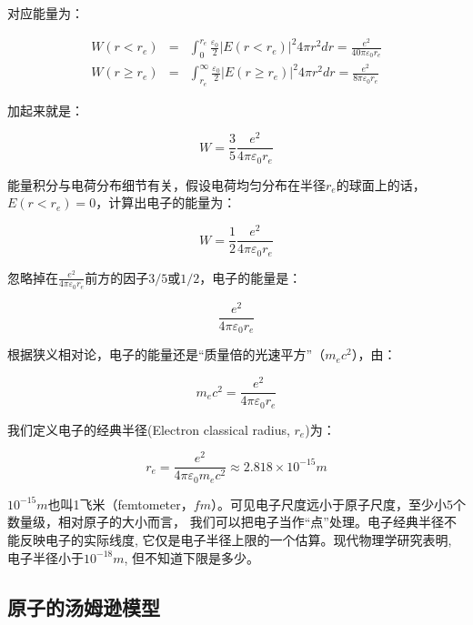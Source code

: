 对应能量为：

\begin{eqnarray*}
W(r < r_e ) &=& \int_{0}^{r_e} \frac{\varepsilon _0 }{2} | E(r< r_e)|^2 4\pi r^2 dr = \frac{e^2 }{40 \pi \varepsilon _0 r_e } \\
W(r \ge r_e ) &=& \int_{r_e}^{\infty} \frac{\varepsilon _0 }{2} | E(r \ge r_e)|^2 4\pi r^2 dr = \frac{e^2 }{8\pi \varepsilon _0 r_e }
\end{eqnarray*}

加起来就是：

\begin{equation}
W = \frac{3 }{5} \frac{e^2}{ 4\pi \varepsilon _0 r_e} 
\end{equation}

能量积分与电荷分布细节有关，假设电荷均匀分布在半径$r_e$的球面上的话，$E(r< r_e) = 0$，计算出电子的能量为：

\begin{equation}
W = \frac{1}{2} \frac{e^2}{ 4\pi \varepsilon _0 r_e} 
\end{equation}

忽略掉在$\frac{e^2}{ 4\pi \varepsilon _0 r_e}$前方的因子$3/5$或$1/2$，电子的能量是：

\begin{equation}
\frac{e^2}{ 4\pi \varepsilon _0 r_e} 
\end{equation}

根据狭义相对论，电子的能量还是“质量倍的光速平方”（$m_e c^2 $），由：

\begin{equation}
m_e c^2  = \frac{e^2}{ 4\pi \varepsilon _0 r_e} 
\end{equation}

我们定义电子的经典半径(Electron classical radius, $r_e$)为：

\begin{equation}
r_e  = \frac{{e^2 }}{{4\pi \varepsilon _0 m_e c^2 }} \approx 2.818 \times 10^{-15} m
\end{equation}

$10^{-15}m$也叫1飞米（femtometer，$fm$）。可见电子尺度远小于原子尺度，至少小5个数量级，相对原子的大小而言，
我们可以把电子当作“点”处理。电子经典半径不能反映电子的实际线度,
它仅是电子半径上限的一个估算。现代物理学研究表明,
电子半径小于$10^{-18}m$, 但不知道下限是多少。


\subsection{原子的汤姆逊模型}


